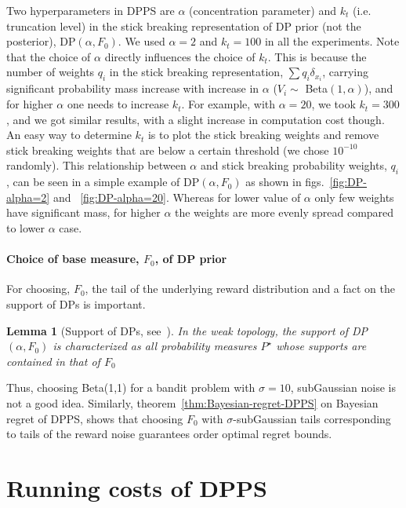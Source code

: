 \documentclass[10pt]{article}
\newtheorem{lemma}[thm]{Lemma}
\begin{document}
Two hyperparameters in DPPS are $\alpha$ (concentration parameter) and $k_t$ (i.e. truncation level) in the stick breaking representation of DP prior (not the posterior), DP$(\alpha,F_{0})$.  We used $\alpha =2$ and $k_t = 100$ in all the experiments. Note that the choice of $\alpha$ directly influences the choice of $k_t$. This is because the number of weights $q_{i}$ in the stick breaking representation, $\sum q_{i} \delta_{x_{i}}$, carrying significant probability mass increase with increase in $\alpha$ ($V_{i}\sim$ Beta$(1,\alpha)$), and for higher $\alpha$ one needs to increase $k_t$.  For example, with $\alpha = 20$, we took $k_t =300$, and we got similar results, with a slight increase in computation cost though. An easy way to determine $k_t$ is to plot the stick breaking weights and remove stick breaking weights that are below a certain threshold (we chose $10^{-10}$ randomly). This relationship between $\alpha$ and stick breaking probability weights, $q_{i}$, can be seen in a simple example of $\mathrm{DP}(\alpha, F_{0})$ as shown in figs.~\ref{fig:DP-alpha=2}  and ~\ref{fig:DP-alpha=20}. Whereas for lower value of $\alpha$ only few weights have significant mass, for higher $\alpha$ the weights are more evenly spread compared to lower $\alpha$ case. 

\paragraph{Choice of base measure, $F_{0}$, of DP prior}

For choosing, $F_{0}$, the tail of the underlying reward distribution and a fact on the support of DPs is important. 
 
\begin{lemma}[Support of DPs, see~\citep{ghosal2010dirichlet}] In the \textit{weak topology}, the support of DP$(\alpha,F_{0})$ is characterized as all probability measures $P^\star$ whose supports are contained in that of $F_{0}$
\end{lemma}

Thus, choosing Beta(1,1) for a bandit problem with $\sigma = 10$, subGaussian noise is not a good idea. Similarly, theorem~\ref{thm:Bayesian-regret-DPPS} on Bayesian regret of DPPS, shows that choosing $F_{0}$ with $\sigma$-subGaussian tails corresponding to tails of the reward noise guarantees order optimal regret bounds.



\section{Running costs of DPPS}
\label{sec:computational-complexity-DPPS-NPTS}
\end{document}
